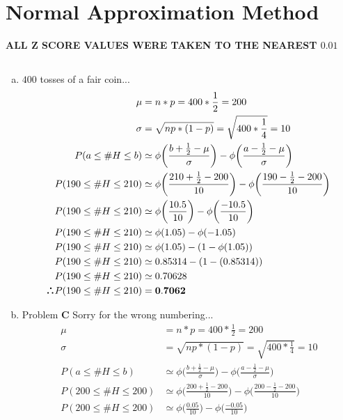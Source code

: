 \documentclass[10pt]{report}
\def\therefore{\boldsymbol{\text{ }
\leavevmode
\lower0.4ex\hbox{$\cdot$}
\kern-.5em\raise0.7ex\hbox{$\cdot$}
\kern-0.6em\lower0.4ex\hbox{$\cdot$}
\thinspace\text{ }}}
\begin{document}
\section{\sc\color{cit}Normal Approximation Method}
\textbf{ALL Z SCORE VALUES WERE TAKEN TO THE NEAREST $\mathbf{0.01} $}
\setcounter{subsection}{0}
 \subsection{}
 \begin{enumerate}[(a)]
\item $400 $ tosses of a fair coin...
\begin{align*}
\mu &= n*p = 400*\frac{1}{2} = 200\\
\sigma &= \sqrt{np*(1-p)} = \sqrt{400*\frac{1}{4}} = 10\\
P(a \leq \#H \leq b) &\simeq \phi \bigg(\frac{b+\frac{1}{2} - \mu}{\sigma}\bigg) - \phi \bigg(\frac{a-\frac{1}{2} - \mu}{\sigma}\bigg) \\
P(190 \leq \#H \leq 210) &\simeq \phi \bigg(\frac{210+\frac{1}{2} - 200}{10}\bigg) - \phi \bigg(\frac{190-\frac{1}{2} - 200}{10}\bigg) \\
P(190 \leq \#H \leq 210) &\simeq \phi \bigg(\frac{10.5}{10}\bigg) - \phi \bigg(\frac{-10.5}{10}\bigg) \\
P(190 \leq \#H \leq 210) &\simeq \phi (1.05) - \phi(-1.05) \\
P(190 \leq \#H \leq 210) &\simeq \phi (1.05) - (1-\phi(1.05)) \\
P(190 \leq \#H \leq 210) &\simeq 0.85314 - (1-(0.85314)) \\
P(190 \leq \#H \leq 210) &\simeq 0.70628 \\
\therefore P(190 \leq \#H \leq 210) &= \mathbf{0.7062} \\
\end{align*}
\item Problem \textbf{C} Sorry for the wrong numbering...
\begin{align*}
\mu &= n*p = 400*\frac{1}{2} = 200\\
\sigma &= \sqrt{np*(1-p)} = \sqrt{400*\frac{1}{4}} = 10\\
P(a \leq \#H \leq b) &\simeq \phi \bigg(\frac{b+\frac{1}{2} - \mu}{\sigma}\bigg) - \phi \bigg(\frac{a-\frac{1}{2} - \mu}{\sigma}\bigg) \\
P(200 \leq \#H \leq 200) &\simeq \phi \bigg(\frac{200+\frac{1}{2} - 200}{10}\bigg) - \phi \bigg(\frac{200-\frac{1}{2} - 200}{10}\bigg) \\
P(200 \leq \#H \leq 200) &\simeq \phi \bigg(\frac{0.05}{10}\bigg) - \phi \bigg(\frac{-0.05}{10}\bigg) \\

\end{align*}
\end{enumerate}
\end{document}
